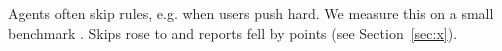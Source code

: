 Agents often skip rules, e.g. when users push hard.
We measure this on a small benchmark \citep{key2024}.
Skips rose to \NumA{} and reports fell by \NumB{} points (see Section~\ref{sec:x}).
